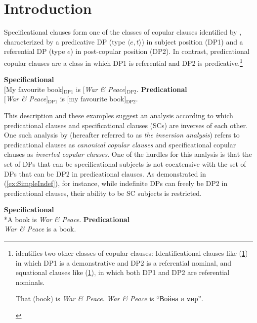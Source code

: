 \documentclass[
	letterpaper,
]{article}
\begin{document}
\section{Introduction}
Specificational clauses form one of the classes of copular clauses identified by \textcite{higgins1973pseudo}, characterized by a predicative DP (type $\langle e,t\rangle$) in subject position (DP1) and a referential DP (type $e$) in post-copular position (DP2).
In contrast, predicational copular clauses are a class in which DP1 is referential and DP2 is predicative.\footnote{
	\textcite{higgins1973pseudo} identifies two other classes of copular clauses:
	Identificational clauses like (\ref{ex:IDCl}) in which DP1 is a demonstrative and DP2 is a referential nominal, and equational clauses like (\ref{ex:EqCl}), in which both DP1 and DP2 are referential nominals.
	\begin{xlisti}
		\ex\label{ex:IDCl} That (book) is \textit{War \& Peace}.
		\ex\label{ex:EqCl} \textit{War \& Peace} is \foreignlanguage{russian}{``Война и мир''}.	
	\end{xlisti}

}
\begin{exe}
	\ex
	\begin{xlist}	
		\ex\label{ex:SC} \textbf{Specificational}\\
		{[My favourite book]$_{\text{DP1}}$} is {[\textit{War \& Peace}]$_{\text{DP2}}$}.
		\ex\label{ex:PC} \textbf{Predicational}\\
		{[\textit{War \& Peace}]$_{\text{DP1}}$} is {[my favourite book]$_{\text{DP2}}$}.
	\end{xlist}
\end{exe}
This description and these examples suggest an analysis according to which predicational clauses and specificational clauses (SCs) are inverses of each other.
One such analysis by \textcite{moro1997raising} (hereafter referred to as \textit{the inversion analysis}) refers to predicational clauses as \textit{canonical copular clauses} and specificational copular clauses as \textit{inverted copular clauses}.
One of the hurdles for this analysis is that the set of DPs that can be specificational subjects is not coextensive with the set of DPs that can be DP2 in predicational clauses.
As demonstrated in (\ref{ex:SimpleIndef}), for instance, while indefinite DPs can freely be DP2 in predicational clauses, their ability to be SC subjects is restricted. 
\begin{exe}
	\ex\label{ex:SimpleIndef}
	\begin{xlist}
		\ex  \textbf{Specificational}\\
		*A book is \textit{War \& Peace}.
		\ex \textbf{Predicational}\\
		\textit{War \& Peace} is a book.	
	\end{xlist}
\end{exe}
\end{document}
